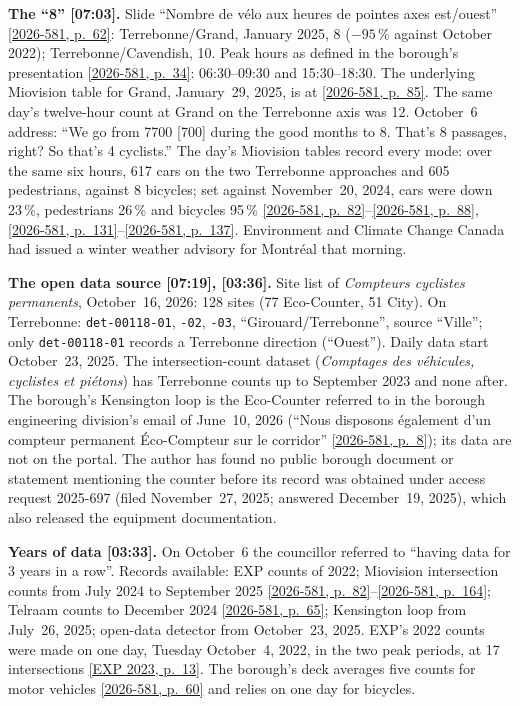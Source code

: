 \documentclass[11pt,letterpaper]{article}
\newcommand{\repourl}{https://github.com/OpenMobilityData/Terrebonne-open-sources}
\newcommand{\pagesurl}{https://openmobilitydata.github.io/Terrebonne-access-requests}
\newcommand{\cliptime}[1]{\textsf{\small[#1]}}
\newcommand{\pgl}[2]{\href{\pagesurl/2026-581/raw/01_emails_mandate_counts.pdf\#page=#1}{\textsf{\small[2026-581, p.~#2]}}}
\newcommand{\pg}[1]{\pgl{#1}{#1}}
\newcommand{\exppg}[1]{\href{\repourl/blob/main/2023-exp-mobility-study/raw/EXP_Etude_de_mobilite_rue_de_Terrebonne_2023.pdf}{\textsf{\small[EXP 2023, p.~#1]}}}
\begin{document}
\textbf{The ``8'' \cliptime{07:03}.} Slide ``Nombre de vélo aux heures de
pointes axes est/ouest'' \pg{62}: Terrebonne/Grand, January 2025, 8
($-95$\,\% against October 2022); Terrebonne/Cavendish, 10. Peak hours as
defined in the borough's presentation \pg{34}: 06:30--09:30 and
15:30--18:30. The underlying Miovision table for Grand, January~29, 2025, is
at \pg{85}. The same day's twelve-hour count at Grand on the Terrebonne axis
was 12. October~6 address: ``We go from 7700 [700] during the good months
to 8. That's 8 passages, right? So that's 4 cyclists.'' The day's Miovision
tables record every mode: over the same six hours, 617 cars on the two
Terrebonne approaches and 605 pedestrians, against 8 bicycles; set against
November~20, 2024, cars were down 23\,\%, pedestrians 26\,\% and bicycles
95\,\% \pg{82}--\pg{88}, \pg{131}--\pg{137}. Environment and Climate Change
Canada had issued a winter weather advisory for Montréal that morning.

\textbf{The open data source \cliptime{07:19}, \cliptime{03:36}.} Site list
of \emph{Compteurs cyclistes permanents}, October~16, 2026: 128 sites (77
Eco-Counter, 51 City). On Terrebonne: \texttt{det-00118-01}, \texttt{-02},
\texttt{-03}, ``Girouard/Terrebonne'', source ``Ville''; only
\texttt{det-00118-01} records a Terrebonne direction (``Ouest''). Daily data
start October~23, 2025. The intersection-count dataset
(\emph{Comptages des véhicules, cyclistes et piétons}) has Terrebonne counts
up to September 2023 and none after. The borough's Kensington loop is the
Eco-Counter referred to in the borough engineering division's email of
June~10, 2026 (``Nous disposons également d'un compteur permanent
Éco-Compteur sur le corridor'' \pg{8}); its data are not on the portal.
The author has found no public borough document or statement mentioning
the counter before its record was obtained under access request 2025-697
(filed November~27, 2025; answered December~19, 2025), which also released
the equipment documentation.

\textbf{Years of data \cliptime{03:33}.} On October~6 the councillor
referred to ``having data for 3 years in a row''. Records available: EXP
counts of 2022; Miovision intersection counts from July 2024 to September
2025 \pg{82}--\pg{164}; Telraam counts to December 2024 \pg{65}; Kensington
loop from July~26, 2025; open-data detector from October~23, 2025. EXP's
2022 counts were made on one day, Tuesday October~4, 2022, in the two peak
periods, at 17 intersections \exppg{13}. The borough's deck averages five
counts for motor vehicles \pg{60} and relies on one day for bicycles.
\end{document}

